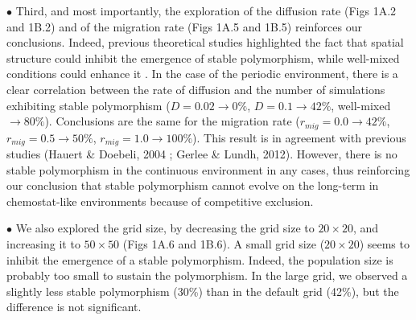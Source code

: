 $\bullet$ Third, and most importantly, the exploration of the diffusion rate (Figs 1A.2 and 1B.2) and of the migration rate (Figs 1A.5 and 1B.5) reinforces our conclusions. Indeed, previous theoretical studies highlighted the fact that spatial structure could inhibit the emergence of stable polymorphism, while well-mixed conditions could enhance it \citep{hauert-doebeli-2004,gerlee-lundh-2012}. In the case of the periodic environment, there is a clear correlation between the rate of diffusion and the number of simulations exhibiting stable polymorphism ($D=0.02 \rightarrow 0\%$, $D=0.1 \rightarrow 42\%$, well-mixed$ \rightarrow 80\%$). Conclusions are the same for the migration rate ($r_{mig}=0.0 \rightarrow 42\%$, $r_{mig}=0.5 \rightarrow 50\%$, $r_{mig}=1.0 \rightarrow 100\%$). This result is in agreement with previous studies (Hauert \& Doebeli, 2004 ; Gerlee \& Lundh, 2012). However, there is no stable polymorphism in the continuous environment in any cases, thus reinforcing our conclusion that stable polymorphism cannot evolve on the long-term in chemostat-like environments because of competitive exclusion.

$\bullet$ We also explored the grid size, by decreasing the grid size to $20\times20$, and increasing it to $50\times50$ (Figs 1A.6 and 1B.6). A small grid size ($20\times20$) seems to inhibit the emergence of a stable polymorphism. Indeed, the population size is probably too small to sustain the polymorphism. In the large grid, we observed a slightly less stable polymorphism (30\%) than in the default grid (42\%), but the difference is not significant.

\newpage

\begin{figurehere}
\centering
{}
\label{Fig1}
\end{figurehere}
